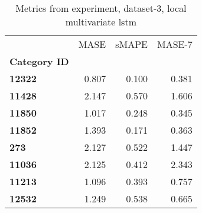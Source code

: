 \begin{table}[h]
\centering
\caption{Metrics from experiment, dataset-3, local multivariate lstm}
\label{table:local-multivariate-lstm-dataset-3}
\begin{tabular}{lrrr}
\toprule
{} &   MASE &  sMAPE &  MASE-7 \\
\textbf{Category ID} &        &        &         \\
\midrule
\textbf{12322      } &  0.807 &  0.100 &   0.381 \\
\textbf{11428      } &  2.147 &  0.570 &   1.606 \\
\textbf{11850      } &  1.017 &  0.248 &   0.345 \\
\textbf{11852      } &  1.393 &  0.171 &   0.363 \\
\textbf{273        } &  2.127 &  0.522 &   1.447 \\
\textbf{11036      } &  2.125 &  0.412 &   2.343 \\
\textbf{11213      } &  1.096 &  0.393 &   0.757 \\
\textbf{12532      } &  1.249 &  0.538 &   0.665 \\
\bottomrule
\end{tabular}
\end{table}
